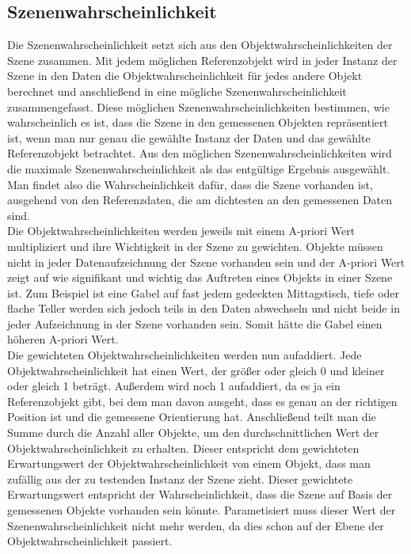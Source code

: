 \subsection{Szenenwahrscheinlichkeit}
Die Szenenwahrscheinlichkeit setzt sich aus den Objektwahrscheinlichkeiten der Szene zusammen. Mit jedem möglichen Referenzobjekt wird in jeder Instanz der Szene in den Daten die Objektwahrscheinlichkeit für jedes andere Objekt berechnet und anschließend in eine mögliche Szenenwahrscheinlichkeit zusammengefasst. Diese möglichen Szenenwahrscheinlichkeiten bestimmen, wie wahrscheinlich es ist, dass die Szene in den gemessenen Objekten repräsentiert ist, wenn man nur genau die gewählte Instanz der Daten und das gewählte Referenzobjekt betrachtet. Aus den möglichen Szenenwahrscheinlichkeiten wird die maximale Szenenwahrscheinlichkeit als das entgültige Ergebnis ausgewählt. Man findet also die Wahrscheinlichkeit dafür, dass die Szene vorhanden ist, ausgehend von den Referenzdaten, die am dichtesten an den gemessenen Daten sind.\smallskip\\
Die Objektwahrscheinlichkeiten werden jeweils mit einem A-priori Wert multipliziert und ihre Wichtigkeit in der Szene zu gewichten. Objekte müssen nicht in jeder Datenaufzeichnung der Szene vorhanden sein und der A-priori Wert zeigt auf wie signifikant und wichtig das Auftreten eines Objekts in einer Szene ist. Zum Beispiel ist eine Gabel auf fast jedem gedeckten Mittagstisch, tiefe oder flache Teller werden sich jedoch teils in den Daten abwechseln und nicht beide in jeder Aufzeichnung in der Szene vorhanden sein. Somit hätte die Gabel einen höheren A-priori Wert. \smallskip\\
Die gewichteten Objektwahrscheinlichkeiten werden nun aufaddiert. Jede Objektwahrscheinlichkeit hat einen Wert, der größer oder gleich 0 und kleiner oder gleich 1 beträgt. Außerdem wird noch 1 aufaddiert, da es ja ein Referenzobjekt gibt, bei dem man davon ausgeht, dass es genau an der richtigen Position ist und die gemessene Orientierung hat. Anschließend teilt man die Summe durch die Anzahl aller Objekte, um den durchschnittlichen Wert der Objektwahrscheinlichkeit zu erhalten. Dieser entspricht dem gewichteten Erwartungswert der Objektwahrscheinlichkeit von einem Objekt, dass man zufällig aus der zu testenden Instanz der Szene zieht. Dieser gewichtete Erwartungswert entspricht der Wahrscheinlichkeit, dass die Szene auf Basis der gemessenen Objekte vorhanden sein könnte. Parametisiert muss dieser Wert der Szenenwahrscheinlichkeit nicht mehr werden, da dies schon auf der Ebene der Objektwahrscheinlichkeit passiert.\smallskip\\

